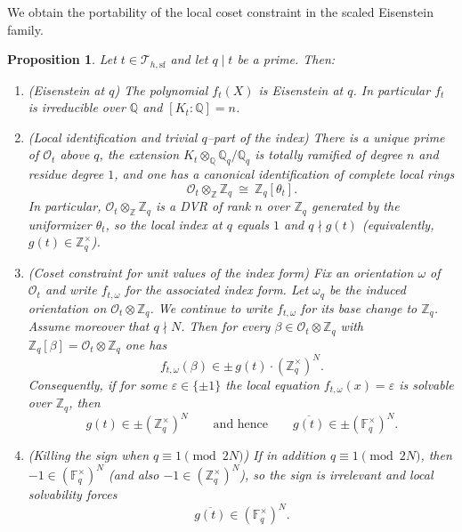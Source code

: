 \documentclass[11pt,letterpaper]{amsart}
\newcommand{\Z}{\mathbb{Z}}
\newcommand{\Q}{\mathbb{Q}}
\newcommand{\F}{\mathbb{F}}
\newcommand{\Ocal}{\mathcal{O}}
\theoremstyle{plain}
\newtheorem{proposition}[theorem]{Proposition}
\theoremstyle{definition}
\theoremstyle{remark}
\theoremstyle{plain}
\begin{document}
We obtain the portability of the local coset constraint in the scaled Eisenstein family.
\begin{proposition}
\label{prop:scaled-portability-merged}
Let $t\in\mathcal{T}_{h,\mathrm{sf}}$ and let $q\mid t$ be a prime.  Then:
\begin{enumerate}[label=\textup{(\roman*)}]
\item \textup{(Eisenstein at $q$)} The polynomial $f_t(X)$ is Eisenstein at $q$.
In particular $f_t$ is irreducible over $\Q$ and $[K_t:\Q]=n$.

\item \textup{(Local identification and trivial $q$--part of the index)} There is a unique prime of $\Ocal_t$ above $q$,
the extension $K_t\otimes_\Q\Q_q/\Q_q$ is totally ramified of degree $n$ and residue degree $1$, and one has
a canonical identification of complete local rings
\[
\Ocal_t\otimes_\Z \Z_q \ \cong\ \Z_q[\theta_t].
\]
In particular, $\Ocal_t\otimes_\Z\Z_q$ is a DVR of rank $n$ over $\Z_q$ generated by the uniformizer $\theta_t$,
so the local index at $q$ equals $1$ and $q\nmid g(t)$ (equivalently, $g(t)\in\Z_q^\times$).

\item \textup{(Coset constraint for unit values of the index form)} Fix an orientation $\omega$ of $\Ocal_t$
and write $f_{t,\omega}$ for the associated index form.
Let $\omega_q$ be the induced orientation on $\Ocal_t\otimes\Z_q$.
We continue to write $f_{t,\omega}$ for its base change to $\Z_q$.
Assume moreover that $q\nmid N$.
Then for every $\beta\in \Ocal_t\otimes\Z_q$ with $\Z_q[\beta]=\Ocal_t\otimes\Z_q$ one has
\[
f_{t,\omega}(\beta)\in \pm\, g(t)\cdot (\Z_q^\times)^N.
\]
Consequently, if for some $\varepsilon\in\{\pm 1\}$ the local equation $f_{t,\omega}(x)=\varepsilon$
is solvable over $\Z_q$, then
\[
g(t)\in \pm(\Z_q^\times)^N
\qquad\text{and hence}\qquad
\overline{g(t)}\in \pm(\F_q^\times)^N.
\]

\item \textup{(Killing the sign when $q\equiv 1\!\!\pmod{2N}$)} If in addition $q\equiv 1\pmod{2N}$,
then $-1\in(\F_q^\times)^N$ (and also $-1\in(\Z_q^\times)^N$), so the sign is irrelevant and local solvability forces
\[
\overline{g(t)}\in(\F_q^\times)^N.
\]
\end{enumerate}
\end{proposition}
\end{document}
